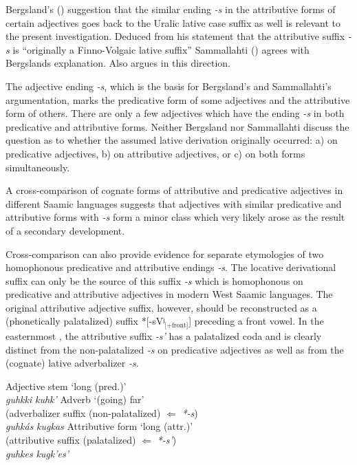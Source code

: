 {Bergsland's (\citeyear[96]{bergsland1946}) suggestion that the similar ending \textit{-s} in the attributive forms of certain adjectives goes back to the Uralic lative case suffix as well is relevant to the present investigation. Deduced from his statement that the attributive suffix \textit{-s} is “originally a Finno-Volgaic lative suffix” Sammallahti (\citeyear[71]{sammallahti1998b}) agrees with Bergslands explanation. Also \cite{judakin1997} argues in this direction.

The adjective ending \textit{-s}, which is the basis for Bergsland's and Sammallahti's argumentation, marks the predicative form of some adjectives and the attributive form of others. There are only a few adjectives which have the ending \textit{-s} in both predicative and attributive forms. Neither Bergsland nor Sammallahti discuss the question as to whether the assumed lative derivation originally occurred: a) on predicative adjectives, b) on attributive adjectives, or c) on both forms simultaneously.
 
A cross-comparison of cognate forms of attributive and predicative adjectives in different Saamic languages suggests that adjectives with similar predicative and attributive forms with \textit{-s} form a minor class which very likely arose as the result of a secondary development.

Cross-comparison can also provide evidence for separate etymologies of two homophonous predicative and attributive endings \textit{-s}. The locative derivational suffix can only be the source of this suffix \textit{-s} which is homophonous on predicative and attributive adjectives in modern West Saamic languages. The original attributive adjective suffix, however, should be reconstructed as a (phonetically palatalized) suffix *[-sVʲ$_{\text{[+front]}}$] preceding a front vowel. In the easternmost , the attributive suffix \textit{-s'} has a palatalized coda and is clearly distinct from the non-palatalized \textit{-s} on predicative adjectives as well as from the (cognate) lative adverbalizer \textit{-s}.
\begin{exe}
\settowidth{}
\ex 
\begin{xlist}
\ex	\rm{Adjective stem ‘long (pred.)’}\\
	\textit{guhkki}	
	\textit{kuhk'}	
\ex 	\rm{Adverb ‘(going) far’}\\
	\rm{(adverbalizer suffix (non-palatalized) $\Leftarrow$ \textit{*-s})}\\
	\textit{guhkás}	
	\textit{kugkas}	
\ex 	\rm{Attributive form ‘long (attr.)’}\\
	\rm{(attributive suffix (palatalized) $\Leftarrow$ \textit{*-s'})}\\
	\textit{guhkes}	
	\textit{kugk'es'}	
\end{xlist} 	
\end{exe}

}
